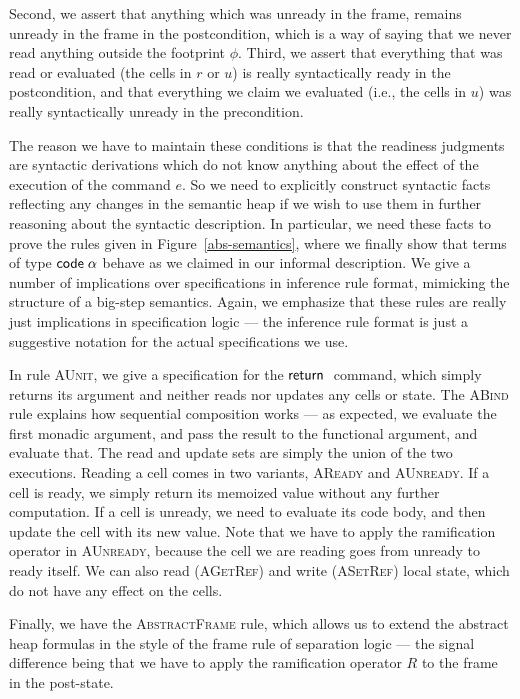 \documentclass[natbib]{sigplanconf}
\begin{document}
Second, we assert that anything which was unready in the frame,
remains unready in the frame in the postcondition, which is a way of
saying that we never read anything outside the footprint $\phi$.
Third, we assert that everything that was read or evaluated (the cells
in $r$ or $u$) is really syntactically ready in the postcondition, and
that everything we claim we evaluated (i.e., the cells in $u$) was
really syntactically unready in the precondition.

The reason we have to maintain these conditions is that the readiness
judgments are syntactic derivations which do not know anything about
the effect of the execution of the command $e$. So we need to
explicitly construct syntactic facts reflecting any changes in the
semantic heap if we wish to use them in further reasoning about the
syntactic description. In particular, we need these facts to prove the
rules given in Figure~\ref{abs-semantics}, where we finally show that
terms of type $\mbox{\textsf{{code}}}\;{\alpha}$ behave as we claimed in our informal
description. We give a number of implications over specifications in
inference rule format, mimicking the structure of a big-step
semantics. Again, we emphasize that these rules are really just 
implications in specification logic --- the inference rule format
is just a suggestive notation for the actual specifications we use.

In rule \textsc{AUnit}, we give a specification for the $\mbox{\textsf{{return}}}\;$
command, which simply returns its argument and neither reads nor
updates any cells or state. The \textsc{ABind} rule explains how
sequential composition works --- as expected, we evaluate the first
monadic argument, and pass the result to the functional argument, and
evaluate that. The read and update sets are simply the union of the
two executions. Reading a cell comes in two variants, \textsc{AReady}
and \textsc{AUnready}. If a cell is ready, we simply return its
memoized value without any further computation. If a cell is unready,
we need to evaluate its code body, and then update the cell with its
new value. Note that we have to apply the ramification operator in
\textsc{AUnready}, because the cell we are reading goes from unready to
ready itself. We can also read (\textsc{AGetRef}) and write
(\textsc{ASetRef}) local state, which do not have any effect on the
cells.

Finally, we have the \textsc{AbstractFrame} rule, which allows us to
extend the abstract heap formulas in the style of the frame rule of 
separation logic --- the signal difference being that we have to apply 
the ramification operator $R$ to the frame in the post-state. 
\end{document}
